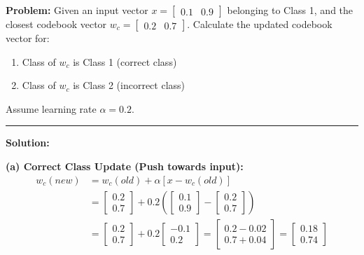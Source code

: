 \documentclass[12pt,a4paper]{article}
\begin{document}
\begin{tcolorbox}[examplebox, title={LVQ Classifier Updates}]
\textbf{Problem:} Given an input vector $x = \begin{bmatrix} 0.1 & 0.9 \end{bmatrix}$ belonging to Class 1, and the closest codebook vector $w_c = \begin{bmatrix} 0.2 & 0.7 \end{bmatrix}$. 
Calculate the updated codebook vector for:
\begin{enumerate}[label=(\alph*), leftmargin=*]
  \item Class of $w_c$ is Class 1 (correct class)
  \item Class of $w_c$ is Class 2 (incorrect class)
\end{enumerate}
Assume learning rate $\alpha = 0.2$.
\par\vspace{4pt}\noindent\rule{\linewidth}{0.5pt}\par
\textbf{Solution:}

\textbf{(a) Correct Class Update (Push towards input):}
\begin{align*}
  w_c(new) &= w_c(old) + \alpha [x - w_c(old)] \\
  &= \begin{bmatrix} 0.2 \\ 0.7 \end{bmatrix} + 0.2 \left( \begin{bmatrix} 0.1 \\ 0.9 \end{bmatrix} - \begin{bmatrix} 0.2 \\ 0.7 \end{bmatrix} \right) \\
  &= \begin{bmatrix} 0.2 \\ 0.7 \end{bmatrix} + 0.2 \begin{bmatrix} -0.1 \\ 0.2 \end{bmatrix} = \begin{bmatrix} 0.2 - 0.02 \\ 0.7 + 0.04 \end{bmatrix} = \begin{bmatrix} 0.18 \\ 0.74 \end{bmatrix}
\end{align*}


\end{tcolorbox}
\end{document}
